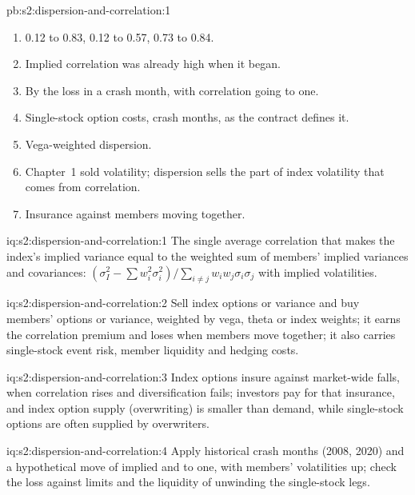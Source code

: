 \begin{solution}{pb:s2:dispersion-and-correlation:1}
\begin{enumerate}
0.65, and loses 11.3 monthly standard deviations when correlation jumps from 0.12 to 0.83 in the first crash; the correlation swap earns 1.74 and loses
0.71 of a unit.
\item 0.12 to 0.83, 0.12 to 0.57, 0.73 to 0.84.
\item Implied correlation was already high when it began.
\item By the loss in a crash month, with correlation going to one.
\item Single-stock option costs, crash months,  as the contract defines it.
\item Vega-weighted dispersion.
\item Chapter~1 sold volatility; dispersion sells the part of index volatility that comes from correlation.
\item Insurance against members moving together.
\end{enumerate}
\end{solution}

\begin{solution}{iq:s2:dispersion-and-correlation:1}
The single average correlation that makes the index's implied variance equal to the weighted sum of members' implied variances and covariances:
$(\sigma_I^2 - \sum w_i^2\sigma_i^2)/\sum_{i \ne j} w_i w_j\sigma_i\sigma_j$ with implied volatilities.
\end{solution}

\begin{solution}{iq:s2:dispersion-and-correlation:2}
Sell index options or variance and buy members' options or variance, weighted by vega, theta or index weights; it earns the correlation premium and
loses when members move together; it also carries single-stock event risk, member liquidity and hedging costs.
\end{solution}

\begin{solution}{iq:s2:dispersion-and-correlation:3}
Index options insure against market-wide falls, when correlation rises and diversification fails; investors pay for that insurance, and index option
supply (overwriting) is smaller than demand, while single-stock options are often supplied by overwriters.
\end{solution}

\begin{solution}{iq:s2:dispersion-and-correlation:4}
Apply historical crash months (2008, 2020) and a hypothetical move of implied and  to one, with members' volatilities up; check the
loss against limits and the liquidity of unwinding the single-stock legs.
\end{solution}

